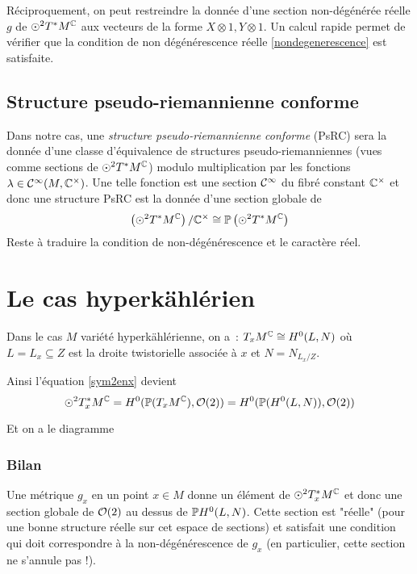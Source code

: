 \documentclass[12pt,makeidx]{amsart}
\begin{document}
Réciproquement, on peut restreindre la donnée d'une section non-dégénérée réelle $g$ de $\odot^2 T^*M^{\mathbb{C}}$ aux vecteurs de la forme $X \otimes 1, Y \otimes 1$. Un calcul rapide permet de vérifier que la condition de non dégénérescence réelle \eqref{nondegenerescence} est satisfaite.

\subsection{Structure pseudo-riemannienne conforme}
Dans notre cas, une \textit{structure pseudo-riemannienne conforme} (PsRC) sera la donnée d'une classe d'équivalence de structures pseudo-riemanniennes (vues comme sections de $\odot^2 T^*M^{\mathbb{C}}$) modulo multiplication par les fonctions $\lambda \in \mathcal{C}^\infty(M,\mathbb{C}^\times)$. Une telle fonction est une section $\mathcal{C}^\infty$ du fibré constant $\mathbb{C}^\times$ et donc une structure PsRC est la donnée d'une section globale de
\[
\left(\odot^2T^* M^{\mathbb{C}}\right) / \mathbb{C}^\times \cong \mathbb{P} \left(\odot^2T^* M^{\mathbb{C}}\right)
\]
Reste à traduire la condition de non-dégénérescence et le caractère réel.

\section{Le cas hyperkählérien}
Dans le cas $M$ variété hyperkählérienne, on a~: $T_x M^{\mathbb{C}} \cong H^0(L,N)$ où $L =L_x \subseteq Z$ est la droite twistorielle associée à $x$ et $N = N_{L_x/Z}$. 

Ainsi l'équation \eqref{sym2enx} devient
\[
\odot^2T^*_xM^{\mathbb{C}} = H^0(\mathbb{P}(T_xM^{\mathbb{C}}), \mathcal{O}(2)) = H^0(\mathbb{P}(H^0(L,N)), \mathcal{O}(2))
\]

Et on a le diagramme
\begin{center}
\end{center}

\subsubsection{Bilan} Une métrique $g_x$ en un point $x \in M$ donne un élément de $\odot^2T^*_x M^{\mathbb{C}}$ et donc une section globale de $\mathcal{O}(2)$ au dessus de $\mathbb{P} H^0(L,N)$.
Cette section est "réelle" (pour une bonne structure réelle sur cet espace de sections) et satisfait une condition qui doit correspondre à la non-dégénérescence de $g_x$ (en particulier, cette section ne s'annule pas !).
\end{document}
